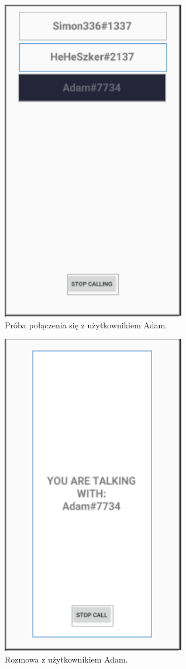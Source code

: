 \begin{figure}[H]
	\centering
	\includegraphics[width=8cm]{images/3.png}
	\caption{\centering Próba połączenia się z użytkownikiem Adam.}
	\hfill 
\end{figure} 
\begin{figure}[H]
	\centering
	\includegraphics[width=8cm]{images/4.png}
	\caption{\centering Rozmowa z użytkownikiem Adam.}
	\hfill 
\end{figure}
\hfill